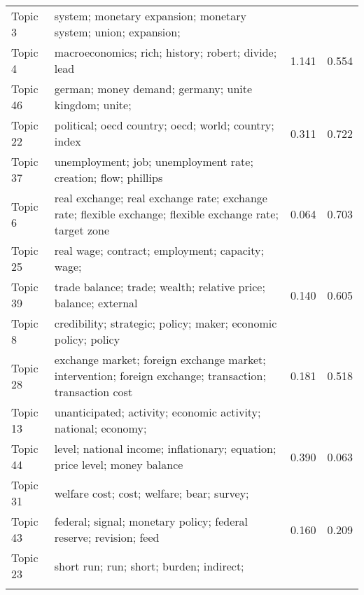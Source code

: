 \documentclass[
  12pt,
  onecolumn]{article}
\begin{document}
\begin{longtable}[t]{l>{\raggedright\arraybackslash}m{30em}cc}
\endfoot
\bottomrule
\endlastfoot
Topic 3 & system;
monetary
expansion;
monetary
system;
union;
expansion;
\cellcolor{gray!6}{stability} & \cellcolor{gray!6}{0.907} & \cellcolor{gray!6}{1.129}\\
Topic 4 & macroeconomics;
rich;
history;
robert;
divide;
lead & 1.141 & 0.554\\
Topic 46 & german;
money
demand;
germany;
unite
kingdom;
unite;
\cellcolor{gray!6}{kingdom} & \cellcolor{gray!6}{0.624} & \cellcolor{gray!6}{0.620}\\
Topic 22 & political;
oecd
country;
oecd;
world;
country;
index & 0.311 & 0.722\\
Topic 37 & unemployment;
job;
unemployment
rate;
creation;
flow;
phillips
\cellcolor{gray!6}{curve} & \cellcolor{gray!6}{0.466} & \cellcolor{gray!6}{0.528}\\
\addlinespace
Topic 6 & real
exchange;
real
exchange
rate;
exchange
rate;
flexible
exchange;
flexible
exchange
rate;
target
zone & 0.064 & 0.703\\
Topic 25 & real
wage;
contract;
employment;
capacity;
wage;
\cellcolor{gray!6}{stickiness} & \cellcolor{gray!6}{0.208} & \cellcolor{gray!6}{0.548}\\
Topic 39 & trade
balance;
trade;
wealth;
relative
price;
balance;
external & 0.140 & 0.605\\
Topic 8 & credibility;
strategic;
policy;
maker;
economic
policy;
policy
\cellcolor{gray!6}{rule} & \cellcolor{gray!6}{0.468} & \cellcolor{gray!6}{0.240}\\
Topic 28 & exchange
market;
foreign
exchange
market;
intervention;
foreign
exchange;
transaction;
transaction
cost & 0.181 & 0.518\\
\addlinespace
Topic 13 & unanticipated;
activity;
economic
activity;
national;
economy;
\cellcolor{gray!6}{gap} & \cellcolor{gray!6}{0.196} & \cellcolor{gray!6}{0.418}\\
Topic 44 & level;
national
income;
inflationary;
equation;
price
level;
money
balance & 0.390 & 0.063\\
Topic 31 & welfare
cost;
cost;
welfare;
bear;
survey;
\cellcolor{gray!6}{household} & \cellcolor{gray!6}{0.467} & \cellcolor{gray!6}{-0.093}\\
Topic 43 & federal;
signal;
monetary
policy;
federal
reserve;
revision;
feed & 0.160 & 0.209\\
Topic 23 & short
run;
run;
short;
burden;
indirect;
\cellcolor{gray!6}{externality} & \cellcolor{gray!6}{0.042} & \cellcolor{gray!6}{0.307}\\
\addlinespace

\end{longtable}
\end{document}
